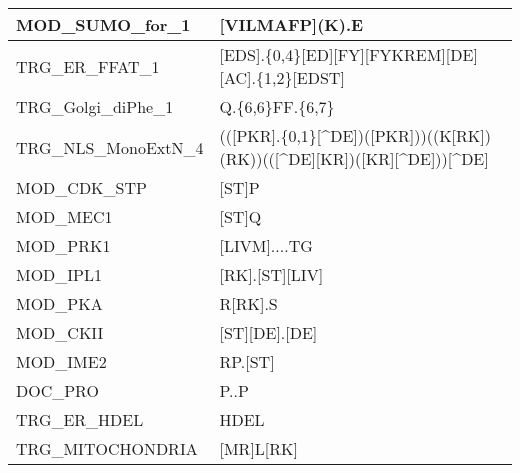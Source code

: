 \begin{landscape}
\begin{longtable}{|l|l|}
\hline
MOD\_SUMO\_for\_1      & {[}VILMAFP](K).E                                                                                                           \\
\hline
TRG\_ER\_FFAT\_1       & {[}EDS].\{0,4\}{[}ED][FY][FYKREM][DE][AC].\{1,2\}{[}EDST]                                                                  \\
\hline
TRG\_Golgi\_diPhe\_1   & Q.\{6,6\}FF.\{6,7\}                                                                                                        \\
\hline
TRG\_NLS\_MonoExtN\_4  & (([PKR].\{0,1\}{[}\^{}DE])\textbar{}([PKR]))((K[RK])\textbar{}(RK))(([\^{}DE][KR])\textbar{}([KR][\^{}DE]))[\^{}DE]        \\
\hline
MOD\_CDK\_STP          & {[}ST]P                                                                                                                    \\
\hline
MOD\_MEC1              & {[}ST]Q                                                                                                                    \\
\hline
MOD\_PRK1              & {[}LIVM]....TG                                                                                                             \\
\hline
MOD\_IPL1              & {[}RK].[ST][LIV]                                                                                                           \\
\hline
MOD\_PKA               & R[RK].S                                                                                                                    \\
\hline
MOD\_CKII              & {[}ST][DE].[DE]                                                                                                            \\
\hline
MOD\_IME2              & RP.[ST]                                                                                                                    \\
\hline
DOC\_PRO               & P..P                                                                                                                       \\
\hline
TRG\_ER\_HDEL          & HDEL                                                                                                                       \\
\hline
TRG\_MITOCHONDRIA      & {[}MR]L[RK]                                                                                                                \\

\end{longtable}
\end{landscape}
